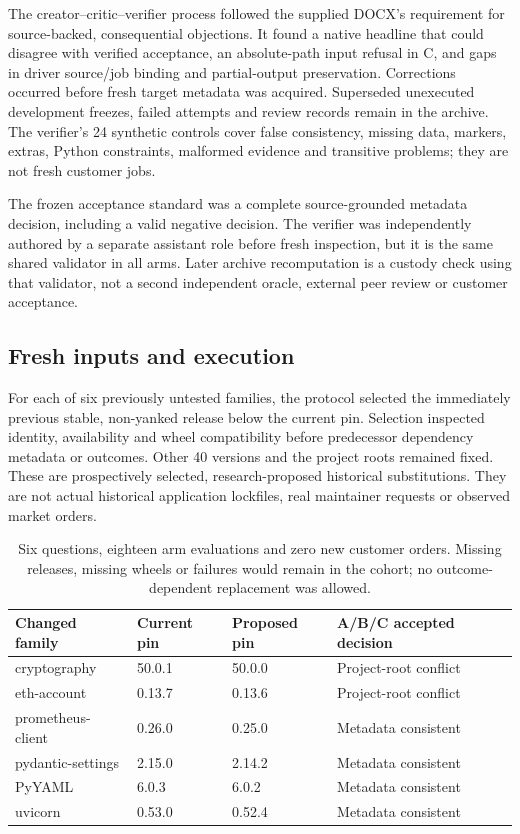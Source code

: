 \documentclass[11pt,letterpaper]{article}
\begin{document}
The creator--critic--verifier process followed the supplied DOCX's requirement for source-backed, consequential objections. It found a native headline that could disagree with verified acceptance, an absolute-path input refusal in C, and gaps in driver source/job binding and partial-output preservation. Corrections occurred before fresh target metadata was acquired. Superseded unexecuted development freezes, failed attempts and review records remain in the archive. The verifier's 24 synthetic controls cover false consistency, missing data, markers, extras, Python constraints, malformed evidence and transitive problems; they are not fresh customer jobs.

The frozen acceptance standard was a complete source-grounded metadata decision, including a valid negative decision. The verifier was independently authored by a separate assistant role before fresh inspection, but it is the same shared validator in all arms. Later archive recomputation is a custody check using that validator, not a second independent oracle, external peer review or customer acceptance.

\subsection{Fresh inputs and execution}

For each of six previously untested families, the protocol selected the immediately previous stable, non-yanked release below the current pin. Selection inspected identity, availability and wheel compatibility before predecessor dependency metadata or outcomes. Other 40 versions and the project roots remained fixed. These are prospectively selected, research-proposed historical substitutions. They are not actual historical application lockfiles, real maintainer requests or observed market orders.

\begin{table}[htbp]
\centering\small
\begin{tabular}{@{}llll@{}}
\toprule
Changed family & Current pin & Proposed pin & A/B/C accepted decision \\
\midrule
cryptography & 50.0.1 & 50.0.0 & Project-root conflict \\
eth-account & 0.13.7 & 0.13.6 & Project-root conflict \\
prometheus-client & 0.26.0 & 0.25.0 & Metadata consistent \\
pydantic-settings & 2.15.0 & 2.14.2 & Metadata consistent \\
PyYAML & 6.0.3 & 6.0.2 & Metadata consistent \\
uvicorn & 0.53.0 & 0.52.4 & Metadata consistent \\
\bottomrule
\end{tabular}
\caption{Six questions, eighteen arm evaluations and zero new customer orders. Missing releases, missing wheels or failures would remain in the cohort; no outcome-dependent replacement was allowed.}
\end{table}
\end{document}
